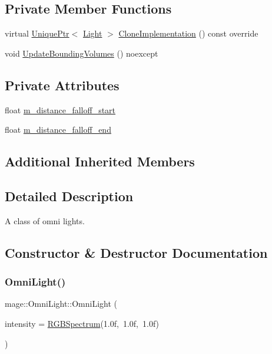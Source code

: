 \subsection*{Private Member Functions}
\begin{DoxyCompactItemize}
\item 
virtual \hyperlink{namespacemage_a3316d7143a973e37adf1110f2e80ca31}{Unique\+Ptr}$<$ \hyperlink{classmage_1_1_light}{Light} $>$ \hyperlink{classmage_1_1_omni_light_a1212457828cdd96cc7170767b7bd1223}{Clone\+Implementation} () const override
\item 
void \hyperlink{classmage_1_1_omni_light_a6a10cdc0ed276d68e5378eaf934158e1}{Update\+Bounding\+Volumes} () noexcept
\end{DoxyCompactItemize}
\subsection*{Private Attributes}
\begin{DoxyCompactItemize}
\item 
float \hyperlink{classmage_1_1_omni_light_ab784744d39ad3d4f4a7b2214a55108f7}{m\+\_\+distance\+\_\+falloff\+\_\+start}
\item 
float \hyperlink{classmage_1_1_omni_light_a4ee5cc4103305dc96b43d6286858ef74}{m\+\_\+distance\+\_\+falloff\+\_\+end}
\end{DoxyCompactItemize}
\subsection*{Additional Inherited Members}


\subsection{Detailed Description}
A class of omni lights. 

\subsection{Constructor \& Destructor Documentation}
\hypertarget{classmage_1_1_omni_light_a94794dd7c19fcac0c0d0b9d83108513b}{}\label{classmage_1_1_omni_light_a94794dd7c19fcac0c0d0b9d83108513b} 
\subsubsection{\texorpdfstring{Omni\+Light()}{OmniLight()}\hspace{0.1cm}{\footnotesize\ttfamily [1/3]}}
{\footnotesize\ttfamily mage\+::\+Omni\+Light\+::\+Omni\+Light (\begin{DoxyParamCaption}\item[{const \hyperlink{structmage_1_1_r_g_b_spectrum}{R\+G\+B\+Spectrum} \&}]{intensity = {\ttfamily \hyperlink{structmage_1_1_r_g_b_spectrum}{R\+G\+B\+Spectrum}(1.0f,~1.0f,~1.0f)} }\end{DoxyParamCaption})\hspace{0.3cm}{\ttfamily [explicit]}}

